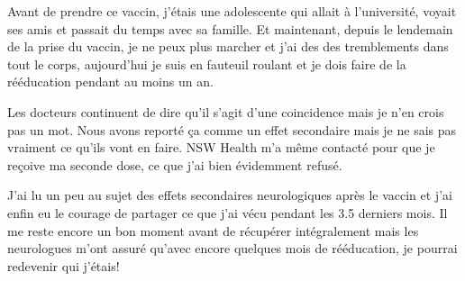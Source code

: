 {Avant de prendre ce vaccin, j'étais une adolescente qui allait à l'université,
voyait ses amis et passait du temps avec sa famille. Et maintenant, depuis le
lendemain de la prise du vaccin, je ne peux plus marcher et j'ai des des
tremblements dans tout le corps, aujourd'hui je suis en fauteuil roulant et je
dois faire de la rééducation pendant au moins un an.

Les docteurs continuent de dire qu'il s'agit d'une coincidence mais je n'en
crois pas un mot. Nous avons reporté ça comme un effet secondaire mais je ne
sais pas vraiment ce qu'ils vont en faire. NSW Health m'a même contacté pour que
je reçoive ma seconde dose, ce que j'ai bien évidemment refusé.

J'ai lu un peu au sujet des effets secondaires neurologiques après le vaccin et
j'ai enfin eu le courage de partager ce que j'ai vécu pendant les 3.5 derniers
mois. Il me reste encore un bon moment avant de récupérer intégralement mais les
neurologues m'ont assuré qu'avec encore quelques mois de rééducation, je pourrai
redevenir qui j'étais!

}
